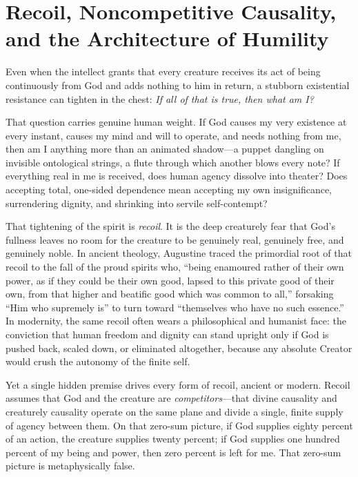 \section{Recoil, Noncompetitive Causality, and the Architecture of Humility}

Even when the intellect grants that every creature receives its act of being continuously from God and adds nothing to him in return, a stubborn existential resistance can tighten in the chest: \emph{If all of that is true, then what am I?}

That question carries genuine human weight. If God causes my very existence at every instant, causes my mind and will to operate, and needs nothing from me, then am I anything more than an animated shadow---a puppet dangling on invisible ontological strings, a flute through which another blows every note? If everything real in me is received, does human agency dissolve into theater? Does accepting total, one-sided dependence mean accepting my own insignificance, surrendering dignity, and shrinking into servile self-contempt?

That tightening of the spirit is \emph{recoil}. It is the deep creaturely fear that God's fullness leaves no room for the creature to be genuinely real, genuinely free, and genuinely noble. In ancient theology, Augustine traced the primordial root of that recoil to the fall of the proud spirits who, ``being enamoured rather of their own power, as if they could be their own good, lapsed to this private good of their own, from that higher and beatific good which was common to all,'' forsaking ``Him who supremely is'' to turn toward ``themselves who have no such essence.'' In modernity, the same recoil often wears a philosophical and humanist face: the conviction that human freedom and dignity can stand upright only if God is pushed back, scaled down, or eliminated altogether, because any absolute Creator would crush the autonomy of the finite self.

Yet a single hidden premise drives every form of recoil, ancient or modern. Recoil assumes that God and the creature are \emph{competitors}---that divine causality and creaturely causality operate on the same plane and divide a single, finite supply of agency between them. On that zero-sum picture, if God supplies eighty percent of an action, the creature supplies twenty percent; if God supplies one hundred percent of my being and power, then zero percent is left for me. That zero-sum picture is metaphysically false.

